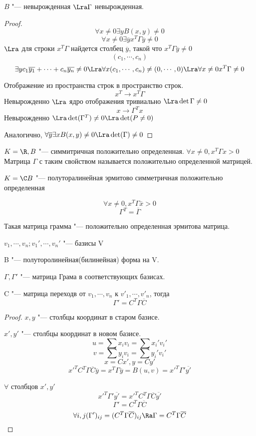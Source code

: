 \begin{lemma}{}
$B$ "--- невырожденная $\Lra \Gamma$ невырожденная. 
\end{lemma}
\begin{proof}
$$\forall x \ne 0 \exists y B(x, y) \ne 0$$
$$\forall x \ne 0 \exists \overline{y} x^{T}\Gamma\overline{y} \ne 0$$
$ \Lra$ для строки $x^{T}\Gamma$ найдется столбец $\overline{y}$, такой что
$x^{T}\Gamma\overline{y} \ne 0$
$$(c_1, \cdots, c_n)$$
$$\exists y c_1\overline{y_1} + \cdots + c_n\overline{y_n} \ne 0 \Lra \forall x (c_1, \cdots, c_n) \ne (0, \cdots, 0) \Lra \forall x \ne 0 x^T\Gamma \ne 0$$

Отображение из пространства строк в пространство строк.
$$x^{T} \to x^T \Gamma$$
Невырожденно $\Lra$ ядро отображения тривиально $\Lra \det \Gamma \ne 0$
$$x \to \Gamma^{T} x $$
Невырожденно $\Lra \det(\Gamma^T) \ne 0 \Lra \det(P \ne 0)$

Аналогично, $\forall \overline{y} \exists x B(x, y) \ne 0 \Lra \det(\Gamma) \ne 0$
\end{proof}
\begin{Def}
$K = \R, B$ "--- симмитричная положительно определенная.
$\forall x \ne 0, x^{T}\Gamma x > 0$
Матрица $\Gamma$ с таким свойством называется положительно определенной матрицей.
\end{Def} 
\begin{Def}
$K = \C B$ "--- полуторалинейная эрмитово симметричная положительно определенная

$$\forall x \ne 0, x^T \Gamma \overline{x} > 0$$
$$\Gamma^T = \overline{\Gamma}$$

Такая матрица грамма "--- положительно определенная эрмитова матрица. 
\end{Def}

\begin{lemma}{}
$v_1, \cdots, v_n; v_1', \cdots, v_n'$ "--- базисы V

B "--- полуторолинейная(билинейная) форма на V.

$\Gamma, \Gamma'$ "--- матрица Грама в соответствующих базисах. 

C "--- матрица переходв от $v_1, \cdots, v_n$ к  $v'_1, \cdots, v'_n$,
тогда
$$\Gamma' = C^{T}\Gamma \overline{C}$$
\end{lemma}

\begin{proof}
$x, y$ "--- столбцы координат в старом базисе. 

$x', y'$ "--- столбцы координат в новом базисе.
$$u = \sum x_i v_i = \sum x_i' v_i'$$
$$v = \sum y_i v_i = \sum y_i' v_i'$$
$$x = C x', y = Cy'$$
$$x'^{T}C^T\Gamma\overline{C}\overline{y} = x^T\Gamma \overline{y} = B(u, v) = x'^{T}\Gamma'\overline{y'} $$

$\forall$ столбцов $x', y'$
$$x'^T \Gamma'\overline{y'} = x'^TC^T \Gamma \overline{C}\overline{y'}$$
$$\Gamma' = C^T\Gamma\overline{C}$$
$$\forall i, j (\Gamma')_{ij} = (C^{T}\Gamma \overline{C})_{ij} \Ra \Gamma = C^{T}\Gamma\overline{C}$$
\end{proof}